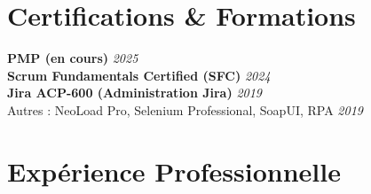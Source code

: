 \documentclass[11pt,a4paper]{article}
\begin{document}

\vspace{6pt}

\section*{Certifications \& Formations}
\textbf{PMP (en cours)} \hfill \textit{\color{mediumgray}2025}\\
\textbf{Scrum Fundamentals Certified (SFC)} \hfill \textit{\color{mediumgray}2024}\\
\textbf{Jira ACP-600 (Administration Jira)} \hfill \textit{\color{mediumgray}2019}\\
Autres : NeoLoad Pro, Selenium Professional, SoapUI, RPA \hfill \textit{\color{mediumgray}2019}\\

\vspace{4pt}

\section*{Expérience Professionnelle}
\end{document}
